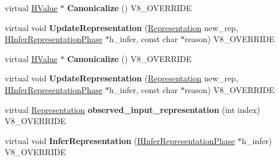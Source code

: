 \begin{DoxyCompactItemize}
\item 
\hypertarget{classv8_1_1internal_1_1_v8___f_i_n_a_l_aad5f871e0a6782c02e742ec017eca3cd}{}virtual \hyperlink{classv8_1_1internal_1_1_h_value}{H\+Value} $\ast$ {\bfseries Canonicalize} () V8\+\_\+\+O\+V\+E\+R\+R\+I\+D\+E\label{classv8_1_1internal_1_1_v8___f_i_n_a_l_aad5f871e0a6782c02e742ec017eca3cd}

\item 
\hypertarget{classv8_1_1internal_1_1_v8___f_i_n_a_l_a646a7a4ee98ffeb1773e958bd227f429}{}virtual void {\bfseries Update\+Representation} (\hyperlink{classv8_1_1internal_1_1_representation}{Representation} new\+\_\+rep, \hyperlink{classv8_1_1internal_1_1_h_infer_representation_phase}{H\+Infer\+Representation\+Phase} $\ast$h\+\_\+infer, const char $\ast$reason) V8\+\_\+\+O\+V\+E\+R\+R\+I\+D\+E\label{classv8_1_1internal_1_1_v8___f_i_n_a_l_a646a7a4ee98ffeb1773e958bd227f429}

\item 
\hypertarget{classv8_1_1internal_1_1_v8___f_i_n_a_l_aad5f871e0a6782c02e742ec017eca3cd}{}virtual \hyperlink{classv8_1_1internal_1_1_h_value}{H\+Value} $\ast$ {\bfseries Canonicalize} () V8\+\_\+\+O\+V\+E\+R\+R\+I\+D\+E\label{classv8_1_1internal_1_1_v8___f_i_n_a_l_aad5f871e0a6782c02e742ec017eca3cd}

\item 
\hypertarget{classv8_1_1internal_1_1_v8___f_i_n_a_l_a646a7a4ee98ffeb1773e958bd227f429}{}virtual void {\bfseries Update\+Representation} (\hyperlink{classv8_1_1internal_1_1_representation}{Representation} new\+\_\+rep, \hyperlink{classv8_1_1internal_1_1_h_infer_representation_phase}{H\+Infer\+Representation\+Phase} $\ast$h\+\_\+infer, const char $\ast$reason) V8\+\_\+\+O\+V\+E\+R\+R\+I\+D\+E\label{classv8_1_1internal_1_1_v8___f_i_n_a_l_a646a7a4ee98ffeb1773e958bd227f429}

\item 
\hypertarget{classv8_1_1internal_1_1_v8___f_i_n_a_l_a0ae00f2f3ee0cfa82cd7f5d92e2db4b4}{}virtual \hyperlink{classv8_1_1internal_1_1_representation}{Representation} {\bfseries observed\+\_\+input\+\_\+representation} (int index) V8\+\_\+\+O\+V\+E\+R\+R\+I\+D\+E\label{classv8_1_1internal_1_1_v8___f_i_n_a_l_a0ae00f2f3ee0cfa82cd7f5d92e2db4b4}

\item 
\hypertarget{classv8_1_1internal_1_1_v8___f_i_n_a_l_af3bdd2a407d823e317547d7f761a77c7}{}virtual void {\bfseries Infer\+Representation} (\hyperlink{classv8_1_1internal_1_1_h_infer_representation_phase}{H\+Infer\+Representation\+Phase} $\ast$h\+\_\+infer) V8\+\_\+\+O\+V\+E\+R\+R\+I\+D\+E\label{classv8_1_1internal_1_1_v8___f_i_n_a_l_af3bdd2a407d823e317547d7f761a77c7}


\end{DoxyCompactItemize}
